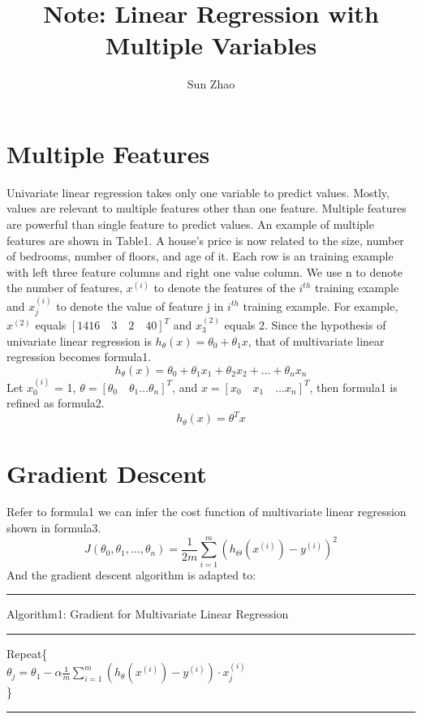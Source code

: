 \documentclass{article}
\title{Note: Linear Regression with Multiple Variables}
\author{Sun Zhao}
\begin{document}
\maketitle
\newpage

\section{Multiple Features}
Univariate linear regression takes only one variable to predict values. Mostly, values are relevant to multiple features other than one feature. Multiple features are powerful than single
 feature to predict values. An example of multiple features are shown in Table1. A house's price is now related to the size, number of bedrooms, number of floors, and age of it. Each row is an training example with left three feature columns and right one value column. We use n to denote the number of features, $x^{(i)}$ to denote the features of the $i^{th}$ training example and $x^{(i)}_{j}$ to denote the value of feature j in $i^{th}$ training example. For example, $x^{(2)}$ equals $[1416 \quad 3 \quad 2 \quad 40]^{T}$ and $x^{(2)}_{3}$ equals 2. Since the hypothesis of univariate linear regression is $h_{\theta}(x) = \theta_{0} + \theta_{1}x$, that of multivariate linear regression becomes formula1.
 \begin{equation}\label{hypothesis}
   h_{\theta}(x) = \theta_{0} + \theta_{1}x_{1} + \theta_{2}x_{2} + \ldots + \theta_{n}x_{n}
 \end{equation}
 Let $x^{(i)}_{0}$ = 1, $\theta = [\theta_{0} \quad \theta_{1} \ldots \theta_{n}]^{T}$, and $x = [x_{0} \quad x_{1} \quad \ldots x_{n}]^{T}$, then formula1 is refined as formula2.
 \begin{equation}\label{hypotheis_refine}
 h_{\theta}(x) = {\theta}^{T}x
 \end{equation}
\section{Gradient Descent}
Refer to formula1 we can infer the cost function of multivariate linear regression shown in formula3.
\begin{equation}\label{cost_function}
  J(\theta_{0}, \theta_{1}, \ldots , \theta_{n}) = \frac{1}{2m} \sum_{i=1}^{m} (h_\Theta({x^{(i)}})-y^{(i)})^2
\end{equation}
And the gradient descent algorithm is adapted to:
\medskip
\hrule
\smallskip
Algorithm1: Gradient for Multivariate Linear Regression
\smallskip
\hrule
\smallskip
Repeat\{\\
$\theta_j=\theta_1 - \alpha \frac{1}{m} \sum_{i=1}^{m}(h_\theta(x^{(i)})-y^{(i)}) \cdot x^{(i)}_{j}$\\
\}\\
\hrule
\end{document}
